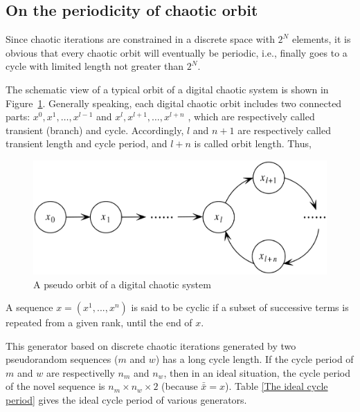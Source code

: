 \subsection{On the periodicity of chaotic orbit}
\label{Conclusions and Future Work}
\label{Experiments and statistical tests}

Since chaotic iterations are constrained in a discrete space with $2^{N}$ elements, it is obvious that every chaotic orbit will eventually be periodic, i.e., finally goes to a cycle with limited length not greater than $2^{N}$.

The schematic view of a typical orbit of a digital chaotic system is shown in Figure~\ref{A pseudo orbit of a digital chaotic system}. Generally speaking, each digital chaotic orbit includes two connected parts: $x^{0} , x^{1} , \dots, x^{l-1}$ and $ x^{l} , x^{l +1} , \dots , x^{l +n}$ , which are respectively called transient (branch) and cycle. Accordingly, $l$ and $n + 1$ are respectively called transient length and cycle period, and $l + n$ is called orbit length. Thus,

\begin{figure}
\centering
\includegraphics[scale=0.20]{images/pseudo_orbit.eps}
\caption{A pseudo orbit of a digital chaotic system}
\label{A pseudo orbit of a digital chaotic system}
\end{figure}


\begin{definition}%
A sequence $x = (x^{ 1} , ..., x^{n} )$ is said to be cyclic if a subset of successive terms is repeated from a given rank, until the end of $x$.
\end{definition}

This generator based on discrete chaotic iterations generated by two pseudorandom sequences ($m$ and $w$) has a long cycle length. If the cycle period of $m$ and $w$ are respectivelly $n_{m}$ and $n_{w}$, then in an ideal situation, the cycle period of the novel sequence is $n_{m} \times n_{w}\times 2$ (because $\bar{\bar{x}}=x$). Table \ref{The ideal cycle period} gives the ideal cycle period of various generators.

